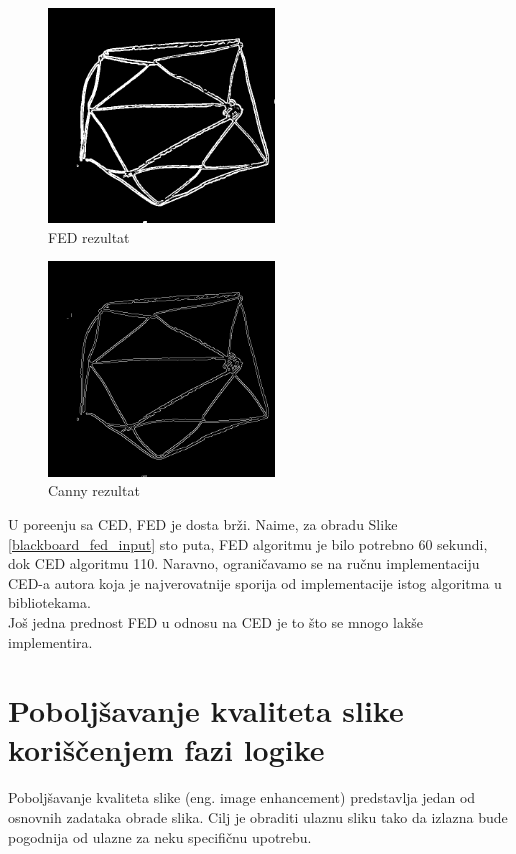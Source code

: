 \documentclass[12pt,a4paper]{article}
\theoremstyle{definition}
\theoremstyle{remark}
\theoremstyle{plain}
\begin{document}
\begin{multicols}{2}
\begin{figure}[H]
\centering
\includegraphics[width=6cm]{images/fuzzy.png}
  \caption{FED rezultat}
\end{figure}

\columnbreak

\begin{figure}[H]
\centering
\includegraphics[width=6cm]{images/canny.png}
  \caption{Canny rezultat}
\end{figure}
\end{multicols}

U pore\dj enju sa CED, FED je dosta br\v zi. Naime, za obradu Slike \ref{blackboard_fed_input} sto puta, FED algoritmu je bilo potrebno 60 sekundi, dok CED algoritmu 110. Naravno, ograni\v cavamo se na ru\v cnu implementaciju CED-a autora koja je najverovatnije sporija od implementacije istog algoritma u bibliotekama.\\

Jo\v s jedna prednost FED u odnosu na CED je to \v sto se mnogo lak\v se implementira.


\section{Pobolj\v savanje kvaliteta slike kori\v s\v cenjem fazi logike}

Pobolj\v savanje kvaliteta slike (eng. image enhancement) predstavlja jedan od osnovnih zadataka obrade slika.
Cilj je obraditi ulaznu sliku tako da izlazna bude pogodnija od ulazne za neku specifi\v cnu upotrebu. 
\end{document}
